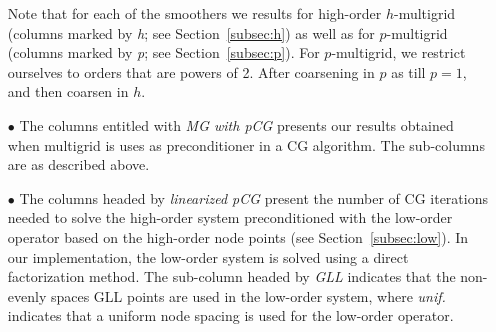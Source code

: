 \documentclass[smallcondensed,final]{svjour3}     %
\begin{document}
\begin{itemize}
  Note that for each of the smoothers we results for high-order
  $h$-multigrid (columns marked by \emph{h}; see
  Section~\ref{subsec:h}) as well as for $p$-multigrid (columns marked
  by \emph{p}; see Section~\ref{subsec:p}). For $p$-multigrid, we
  restrict ourselves to orders that are powers of 2. After coarsening
  in $p$ as till $p=1$, and then coarsen in $h$.
\item[$\bullet$] The columns entitled with \emph{MG with pCG} presents
  our results obtained when multigrid is uses as preconditioner in a
  CG algorithm. The sub-columns are as described above.
\item[$\bullet$] The columns headed by \emph{linearized pCG} present
  the number of CG iterations needed to solve the high-order system
  preconditioned with the low-order operator based on the high-order
  node points (see Section~\ref{subsec:low}). In our implementation,
  the low-order system is solved using a direct factorization method.
  The sub-column headed by \emph{GLL} indicates that the non-evenly
  spaces GLL points are used in the low-order system, where
  \emph{unif.} indicates that a uniform node spacing is used for the
  low-order operator.
\end{itemize}
\end{document}
